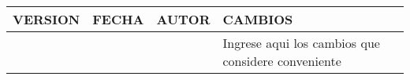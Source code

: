 \begin{table}[H]
\begin{tabular}{|m{1.3cm}|m{1.5cm}|m{2cm}|m{6cm}|} \hline
\cellcolor{colorTerciario}\color{white}VERSION & \cellcolor{colorTerciario}\color{white}FECHA & \cellcolor{colorTerciario}\color{white}AUTOR & \cellcolor{colorTerciario}\color{white}CAMBIOS \\ \hline
 &  &   &  Ingrese aqui los cambios que considere conveniente \\ \hline
\end{tabular}
\end{table}